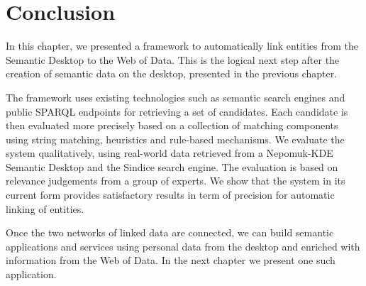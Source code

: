 





 





\section{Conclusion}

In this chapter, we presented a framework to automatically link entities from the Semantic Desktop to the Web of Data. This is the logical next step after the creation of semantic data on the desktop, presented in the previous chapter.

The framework uses existing technologies such as semantic search engines and public SPARQL endpoints for retrieving a set of candidates. Each candidate is then evaluated more precisely based on a collection of matching components using string matching, heuristics and rule-based mechanisms. We evaluate the system qualitatively, using real-world data retrieved from a Nepomuk-KDE Semantic Desktop and the Sindice search engine. The evaluation is based on relevance judgements from a group of experts. We show that the system in its current form provides satisfactory results in term of precision for automatic linking of entities.

Once the two networks of linked data are connected, we can build semantic applications and services using personal data from the desktop and enriched with information from the Web of Data. In the next chapter we present one such application.
